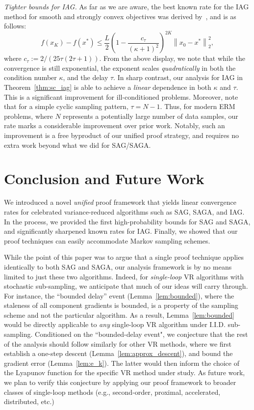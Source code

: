 \documentclass{article}
\theoremstyle{plain}
\theoremstyle{definition}
\newcommand{\norm}[1]{\left\| #1\right\|_{2}}
\newcommand{\paren}[1]{\left( #1\right)}
\begin{document}
\textit{Tighter bounds for IAG.} As far as we are aware, the best known rate for the IAG method for smooth and strongly convex objectives was derived by~\citet{gurbuzbalaban2017convergence}, and is as follows:
\begin{equation}
    f(x_K) - f(x^*)\leq \frac{L}{2}\paren{1-\frac{c_\tau}{(\kappa+1)^2}}^{2K}\norm{x_0-x^*}^2,
    \nonumber
\end{equation}
where $c_\tau:=2/(25\tau(2\tau+1))$. From the above display, we note that while the convergence is still exponential, the exponent scales \emph{quadratically} in both the condition number $\kappa$, and the delay $\tau$. In sharp contrast, our analysis for IAG in Theorem~\ref{thm:sc_iag} is able to achieve a \emph{linear} dependence in both $\kappa$ and $\tau$. This is a significant improvement for ill-conditioned problems. Moreover, note that for a simple cyclic sampling pattern, $\tau = N-1$. Thus, for modern ERM problems, where $N$ represents a potentially large number of data samples, our rate marks a considerable improvement over prior work. Notably, such an improvement is a free byproduct of our unified proof strategy, and requires no extra work beyond what we did for SAG/SAGA. 

\section{Conclusion and Future Work}

We introduced a novel \emph{unified} proof framework that yields linear convergence rates for celebrated variance-reduced algorithms such as SAG, SAGA, and IAG. In the process, we provided the first high-probability bounds for SAG and SAGA, and significantly sharpened known rates for IAG. Finally, we showed that our proof techniques can easily accommodate Markov sampling schemes. 

While the point of this paper was to argue that a single proof technique applies identically to both SAG and SAGA, our analysis framework is by no means limited to just these two algorithms. Indeed, for \emph{single-loop} VR algorithms with stochastic sub-sampling, we anticipate that much of our ideas will carry through. For instance, the ``bounded delay'' event (Lemma~\ref{lem:bounded}), where the staleness of all component gradients is bounded, is a property of the sampling scheme and not the particular algorithm. As a result, Lemma~\ref{lem:bounded} would be directly applicable to \emph{any} single-loop VR algorithm under I.I.D. sub-sampling. Conditioned on the ``bounded-delay event", we conjecture that the rest of the analysis should follow similarly for other VR methods, where we first establish a one-step descent (Lemma~\ref{lem:approx_descent}), and bound the gradient error (Lemma~\ref{lem:e_k}). The latter would then inform the choice of the Lyapunov function for the specific VR method under study. As future work, we plan to verify this conjecture by applying our proof framework to broader classes of single-loop methods (e.g., second-order, proximal, accelerated, distributed, etc.)
\end{document}

